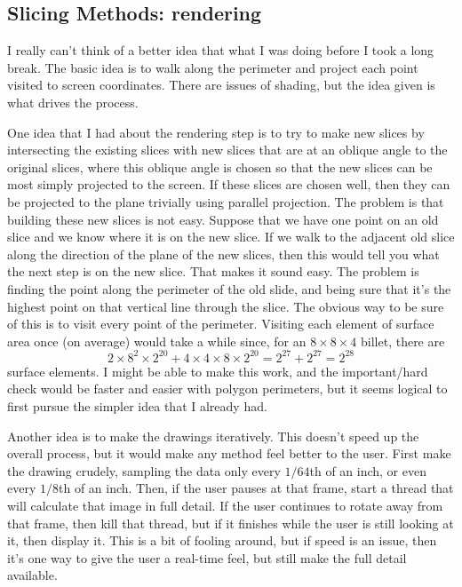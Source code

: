 \documentclass[titlepage,oneside,10pt]{article}
\begin{document}
\subsection{Slicing Methods: rendering}

I really can't think of a better idea that what I was doing before I
took a long break. The basic idea is to walk along the perimeter and project
each point visited to screen coordinates. There are issues of shading,
but the idea given is what drives the process.

One idea that I had about the rendering step is to try to make new
slices by intersecting the existing slices with new slices that are at
an oblique angle to the original slices, where this oblique angle is
chosen so that the new slices can be most simply projected to the
screen. If these slices are chosen well, then they can be projected to
the plane trivially using parallel projection. The problem is that
building these new slices is not easy. Suppose that we have one point on an old
slice and we know where it is on the new slice. If we walk to the
adjacent old slice along the direction of the plane of the new slices,
then this would tell you what the next step is on the new slice.
That makes it sound easy. The problem is finding the point along the
perimeter of the old slide, and being sure that it's the highest point
on that vertical line through the slice. The obvious way to be sure of
this is to visit every point of the perimeter. Visiting each element of
surface area once (on average) would take a while since, for an 
$8\times 8\times 4$ billet, there are 
$$2\times 8^2\times 2^{20}+4\times 4\times8\times2^{20} = 2^{27} +
2^{27} = 2^{28}$$
surface elements. I might be able to make this work, and the important/hard
check would be faster and easier with polygon perimeters, but it seems
logical to first pursue the simpler idea that I already had.

Another idea is to make the drawings iteratively. This doesn't speed
up the overall process, but it would make any method feel better to
the user. First make the drawing crudely, sampling the data only every
$1/64$th of an inch, or even every $1/8$th of an inch. Then, if the
user pauses at that frame, start a thread that will calculate that
image in full detail. If the user continues to rotate away from that
frame, then kill that thread, but if it finishes while the user is
still looking at it, then display it. This is a bit of fooling around,
but if speed is an issue, then it's one way to give the user a
real-time feel, but still make the full detail available. 
\end{document}
